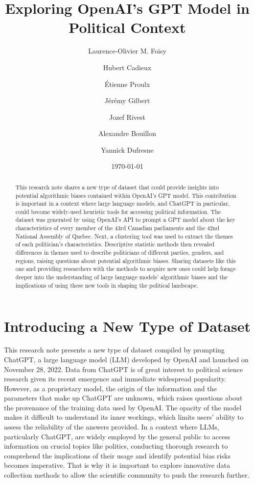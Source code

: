 \documentclass{article}
\title{Exploring OpenAI's GPT Model in Political Context}
\author{
  Laurence-Olivier M. Foisy
  \and
  Hubert Cadieux
  \and
  Étienne Proulx
  \and
 Jérémy Gilbert
  \and
  Jozef Rivest
  \and
  Alexandre Bouillon
  \and
  Yannick Dufresne
}
\date{\today}
\begin{document}
\maketitle

\begin{abstract}
   This research note shares a new type of dataset that could provide insights into potential algorithmic biases contained within OpenAI's GPT model. This contribution is important in a context where large language models, and ChatGPT in particular, could become widely-used heuristic tools for accessing political information. The dataset was generated by using OpenAI's API to prompt a GPT model about the key characteristics of every member of the 43rd Canadian parliaments and the 42nd National Assembly of Quebec. Next, a clustering tool was used to extract the themes of each politician's characteristics. Descriptive statistic methods then revealed differences in themes used to describe politicians of different parties, genders, and regions, raising questions about potential algorithmic biases. Sharing datasets like this one and providing researchers with the methods to acquire new ones could help forage deeper into the understanding of large language models' algorithmic biases and the implications of using these new tools in shaping the political landscape. 
\end{abstract}

\section{Introducing a New Type of Dataset}

This research note presents a new type of dataset compiled by prompting ChatGPT, a large language model (LLM) developed by OpenAI and launched on November 28, 2022. Data from ChatGPT is of great interest to political science research given its recent emergence and immediate widespread popularity. However, as a proprietary model, the origin of the information and the parameters that make up ChatGPT are unknown, which raises questions about the provenance of the training data used by OpenAI. The opacity of the model makes it difficult to understand its inner workings, which limits users' ability to assess the reliability of the answers provided. In a context where LLMs, particularly ChatGPT, are widely employed by the general public to access information on crucial topics like politics, conducting thorough research to comprehend the implications of their usage and identify potential bias risks becomes imperative. That is why it is important to explore innovative data collection methods to allow the scientific community to push the research further.
\end{document}

